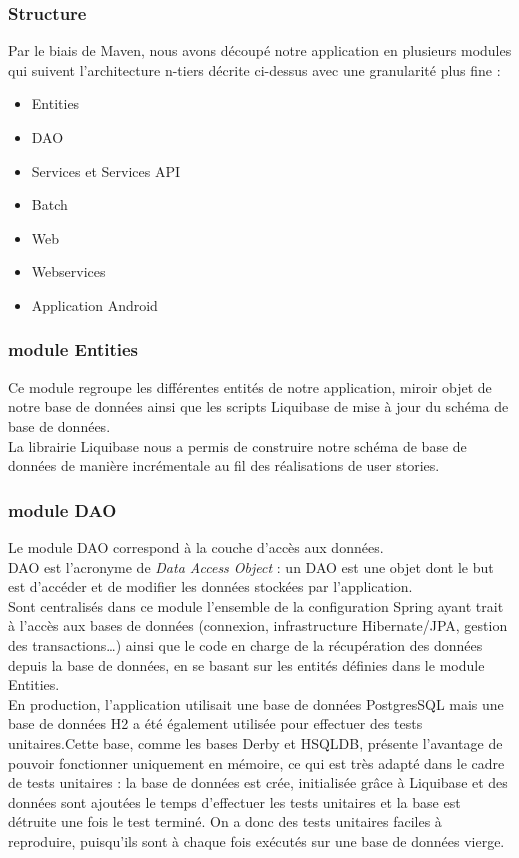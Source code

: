 \subsubsection{Structure}
Par le biais de Maven, nous avons découpé notre application en plusieurs modules qui suivent l'architecture n-tiers décrite ci-dessus avec une granularité plus fine :

\begin{itemize}
	\item Entities
	\item DAO
	\item Services et Services API
	\item Batch
	\item Web
	\item Webservices
	\item Application Android
\end{itemize}

\subsubsection*{module Entities}

Ce module regroupe les différentes entités de notre application, miroir objet de notre base de données ainsi que les scripts Liquibase de mise à jour du schéma de base de données.\\
La librairie Liquibase nous a permis de construire notre schéma de base de données de manière incrémentale  au fil des réalisations de user stories.\\

\subsubsection*{module DAO}

Le module DAO correspond à la couche d'accès aux données.\\
DAO est l'acronyme de \textit{Data Access Object} : un DAO est une objet dont le but est d'accéder et de modifier les données stockées par l'application.\\ 
Sont centralisés dans ce module l'ensemble de la configuration Spring ayant trait à l'accès aux bases de données (connexion, infrastructure Hibernate/JPA, gestion des transactions\ldots) ainsi que le code en charge de la récupération des données depuis la base de données, en se basant sur les entités définies dans le module Entities.\\

En production, l'application utilisait une base de données PostgresSQL mais une base de données H2 a été également utilisée pour effectuer des tests unitaires.Cette base, comme les bases Derby et HSQLDB, présente l'avantage de pouvoir fonctionner uniquement en mémoire, ce qui est très adapté dans le cadre de tests unitaires : la base de données est crée, initialisée grâce à Liquibase et des données sont ajoutées le temps d'effectuer les tests unitaires et la base est détruite une fois le test terminé. On a donc des tests unitaires faciles à reproduire, puisqu'ils sont à chaque fois exécutés sur une base de données vierge.\\

